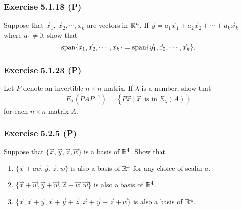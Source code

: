 \documentclass[pdf,9pt,t]{beamer}
\begin{document}
\begin{frame}[fragile]
    \frametitle{Exercise 5.1.18 (P)}
    \begin{problem}
	Suppose that $\vec{x}_1$, $\vec{x}_2,\cdots,\vec{x}_k$ are vectors in $\mathbb{R}^n$.
	If $\vec{y}=a_1 \vec{x}_1 + a_2 \vec{x}_2 + \cdots + a_k \vec{x}_k$ where $a_1\ne 0$,
	show that
	\begin{align*}
	    \mbox{span}\{\vec{x}_1,\vec{x}_2,\cdots,\vec{x}_k\}= \mbox{span}\{\vec{y}_1,\vec{x}_2,\cdots,\vec{x}_k\}.
	\end{align*}
    \end{problem}

\end{frame}
\begin{frame}[fragile]
    \frametitle{Exercise 5.1.23 (P)}
    \begin{problem}
	Let $P$ denote an invertible $n\times n$ matrix. If $\lambda$ is a number, show that
	\begin{align*}
	    E_\lambda(PAP^{-1}) = \left\{P \vec{x}\:|\:\vec{x} \:\: \text{is in $E_\lambda(A)$}\right\}
	\end{align*}
	for each $n\times n$ matrix $A$.
    \end{problem}

\end{frame}
\begin{frame}[fragile]
    \frametitle{Exercise 5.2.5 (P)}
    \begin{problem}
	Suppose that $\{\vec{x},\vec{y},\vec{z},\vec{w}\}$ is a basis of $\mathbb{R}^4$. Show that
	\begin{enumerate}
	    \item $\{\vec{x}+a \vec{w},\vec{y}, \vec{z}, \vec{w}\}$ is also a basis of $\mathbb{R}^4$ for any choice of scalar $a$.
	    \item $\{\vec{x}+\vec{w},\vec{y}+\vec{w}, \vec{z}+\vec{w}, \vec{w}\}$ is also a basis of $\mathbb{R}^4$.
	    \item $\{\vec{x}, \vec{x}+\vec{y}, \vec{x}+\vec{y}+\vec{z},\vec{x}+\vec{y}+\vec{z}+\vec{w}\}$ is also a basis of $\mathbb{R}^4$.
	\end{enumerate}
    \end{problem}

\end{frame}
\end{document}
